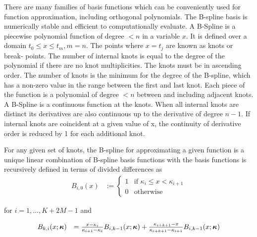 There are many families of basis functions which can be conveniently used for function approximation,
including orthogonal polynomials. The B-spline basis \citep{DeBoor1972} is numerically stable and efficient to
computationally evaluate. A B-Spline is a piecewise polynomial function of degree $< n$ in a variable $x$. It
is defined over a domain $t_0 \leq x \leq t_m, m=n$. The points where $x = t_j$ are known as knots or break-
points. The number of internal knots is equal to the degree of the polynomial if there are no knot
multiplicities. The knots must be in ascending order. The number of knots is the minimum for the degree of the
B-spline, which has a non-zero value in the range between the first and last knot. Each piece of the function
is a polynomial of degree $< n$ between and including adjacent knots. A B-Spline is a continuous function at
the knots. When all internal knots are distinct its derivatives are also continuous up to the derivative of
degree $n - 1$. If internal knots are coincident at a given value of x, the continuity of derivative order is
reduced by 1 for each additional knot.

For any given set of knots, the B-spline for approximating a given function is a unique linear combination of
B-spline basis functions with the basis functions is recursively defined in terms of divided differences as
$$
\begin{array}{rl}
	B_{i, 0}(x) & := \begin{cases}                                                                                                        
	1           & \text{if } \kappa_i \leq x < \kappa_{i+1}                                                                                         \\
	0           & \text{otherwise}                                                                                                        
	\end{cases}
\end{array}
$$

\noindent for $i = 1, \ldots, K + 2M -1$ and

$$
\begin{array}{rl}
	B_{k, i}(x; {\boldsymbol \kappa}) &= \frac{x - \kappa_i}{\kappa_{i + 1} - \kappa_i} B_{i, k-1} (x; {\boldsymbol \kappa}) + 
										\frac{\kappa_{i + k + 1} - x}{\kappa_{i + k + 1} - \kappa_{i + 1}} B_{i, k-1} (x; {\boldsymbol \kappa})
\end{array}
$$

